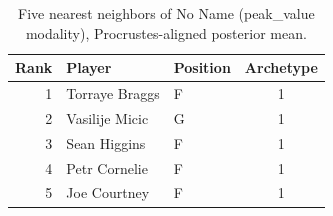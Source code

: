 \begin{table}[htbp]
  \centering\small
  \begin{tabular}{rllc}
    \toprule
    Rank & Player & Position & Archetype \\
    \midrule
    1 & Torraye Braggs & F & 1 \\
    2 & Vasilije Micic & G & 1 \\
    3 & Sean Higgins & F & 1 \\
    4 & Petr Cornelie & F & 1 \\
    5 & Joe Courtney & F & 1 \\
    \bottomrule
  \end{tabular}
  \caption{Five nearest neighbors of No Name (peak_value modality), Procrustes-aligned posterior mean.}
  \label{tab:No_Name_neighbors_peak_value}
\end{table}

